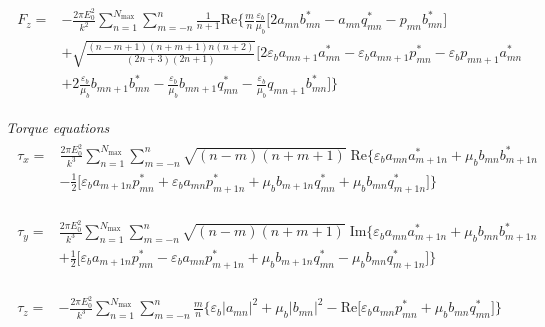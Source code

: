 \documentclass[11pt]{article}
\begin{document}
\begin{align}
\begin{split}
    F_z =& -\frac{2\pi E_0^2}{k^2} \sum_{n=1}^{N_\text{max}} \sum_{m=-n}^{n} \frac{1}{n+1}\text{Re}\bigg\{
          \frac{m}{n} \frac{\varepsilon_b}{\mu_b}
          \bigg[ 2a_{mn}b_{mn}^* - a_{mn}q_{mn}^* - p_{mn}b_{mn}^* \bigg] \\
        & + \sqrt{\frac{(n-m+1)(n+m+1)n(n+2)}{(2n+3)(2n+1)}}
        \bigg[ 2 \varepsilon_b a_{mn+1}a_{mn}^* - \varepsilon_b a_{mn+1}p_{mn}^* - \varepsilon_b p_{mn+1}a_{mn}^* \\
        & + 2 \frac{\varepsilon_b}{\mu_b} b_{mn+1}b_{mn}^* - \frac{\varepsilon_b}{\mu_b} b_{mn+1}q_{mn}^* - \frac{\varepsilon_b}{\mu_b} q_{mn+1}b_{mn}^*
        \bigg] \bigg\}
\end{split}
\end{align}

\emph{Torque equations}
\begin{align}
\begin{split}
    \tau_x =& \frac{2\pi E_0^2}{k^3} \sum_{n=1}^{N_\text{max}} \sum_{m=-n}^{n} \sqrt{(n-m)(n+m+1)} \; \text{Re} \bigg\{
            \varepsilon_b a_{mn}a_{m+1n}^* + \mu_b b_{mn}b_{m+1n}^* \\
            & - \frac{1}{2} \bigg[ \varepsilon_b a_{m+1n}p_{mn}^* + \varepsilon_b a_{mn}p_{m+1n}^*
            + \mu_b b_{m+1n}q_{mn}^* + \mu_b b_{mn}q_{m+1n}^*\bigg] \bigg\}
\end{split}
\end{align}

\begin{align}
\begin{split}
    \tau_y =& \frac{2\pi E_0^2}{k^3} \sum_{n=1}^{N_\text{max}} \sum_{m=-n}^{n} \sqrt{(n-m)(n+m+1)} \; \text{Im} \bigg\{
            \varepsilon_b a_{mn}a_{m+1n}^* + \mu_b b_{mn}b_{m+1n}^* \\
            & + \frac{1}{2} \bigg[ \varepsilon_b a_{m+1n}p_{mn}^* - \varepsilon_b a_{mn}p_{m+1n}^*
            + \mu_b b_{m+1n}q_{mn}^* - \mu_b b_{mn}q_{m+1n}^*\bigg] \bigg\}
\end{split}
\end{align}

\begin{align}
\begin{split}
    \tau_z =& -\frac{2\pi E_0^2}{k^3} \sum_{n=1}^{N_\text{max}} \sum_{m=-n}^{n} \frac{m}{n} \bigg\{
          \varepsilon_b |a_{mn}|^2 + \mu_b |b_{mn}|^2 - \text{Re} \bigg[
              \varepsilon_b a_{mn}p_{mn}^* + \mu_b b_{mn}q_{mn}^*\bigg] \bigg\}
\end{split}
\end{align}
\end{document}
